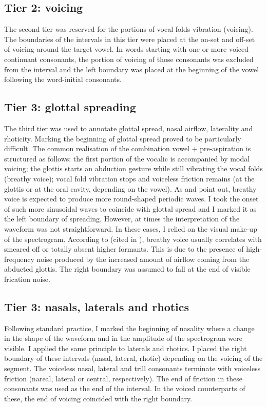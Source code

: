 \documentclass[11pt,a4paper,openany]{memoir}\usepackage[]{graphicx}\usepackage[]{color}
\begin{document}
\subsection{Tier 2: voicing}

The second tier was reserved for the portions of vocal folds vibration (voicing).
The boundaries of the intervals in this tier were placed at the on-set and off-set of voicing around the target vowel.
In words starting with one or more voiced continuant consonants, the portion of voicing of those consonants was excluded from the interval and the left boundary was placed at the beginning of the vowel following the word-initial consonants.

\subsection{Tier 3: glottal spreading}

The third tier was used to annotate glottal spread, nasal airflow, laterality and rhoticity.
Marking the beginning of glottal spread proved to be particularly difficult.
The common realisation of the combination vowel + pre-aspiration is structured as follows: the first portion of the vocalic is accompanied by modal voicing; the glottis starts an abduction gesture while still vibrating the vocal folds (breathy voice); vocal fold vibration stops and voiceless friction remains (at the glottis or at the oral cavity, depending on the vowel).
As \citet{khan2012} and \citet{nance2013} point out, breathy voice is expected to produce more round-shaped periodic waves.
I took the onset of such more sinusoidal waves to coincide with glottal spread and I marked it as the left boundary of spreading.
However, at times the interpretation of the waveform was not straightforward.
In these cases, I relied on the visual make-up of the spectrogram.
According to \citet{jones2006} (cited in \citet[134]{nance2013}), breathy voice usually correlates with smeared off or totally absent higher formants.
This is due to the presence of high-frequency noise produced by the increased amount of airflow coming from the abducted glottis.
The right boundary was assumed to fall at the end of visible frication noise.

\subsection{Tier 3: nasals, laterals and rhotics}

Following standard practice, I marked the beginning of nasality where a change in the shape of the waveform and in the amplitude of the spectrogram were visible.
I applied the same principle to laterals and rhotics.
I placed the right boundary of these intervals (nasal, lateral, rhotic) depending on the voicing of the segment.
The voiceless nasal, lateral and trill consonants terminate with voiceless friction (nareal, lateral or central, respectively).
The end of friction in these consonants was used as the end of the interval.
In the voiced counterparts of these, the end of voicing coincided with the right boundary.
\end{document}
